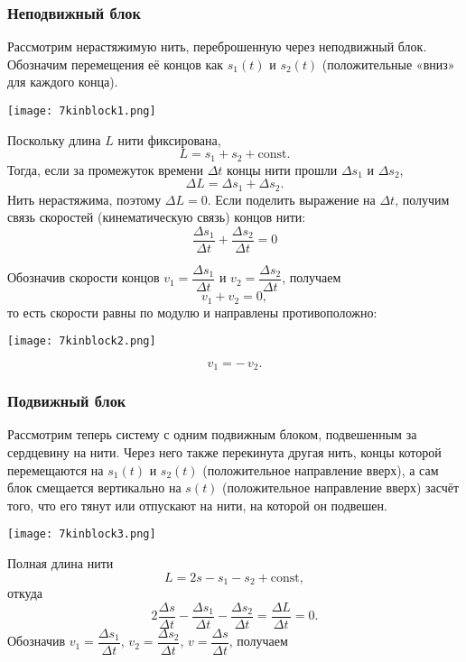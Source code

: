 \documentclass[12pt, a4paper]{article}%
\begin{document}
\subsubsection*{Неподвижный блок}

Рассмотрим нерастяжимую нить, переброшенную через неподвижный блок. Обозначим перемещения её концов как
$s_1(t)$ и $s_2(t)$ (положительные «вниз» для каждого конца). 

\begin{center}
\texttt{[image: 7kinblock1.png]}
\label{fig:mpr}
\end{center}

Поскольку длина $L$ нити фиксирована,  
\[
L = s_1 + s_2 + \mathrm{const}.  
\]  
Тогда, если за промежуток времени $\Delta t$ концы нити прошли $\Delta s_1$ и $\Delta s_2$, 
\[
\Delta L = \Delta s_1 + \Delta s_2.
\]  
Нить нерастяжима, поэтому $\Delta L = 0$. Если поделить выражение на $\Delta t$, получим связь скоростей (кинематическую связь) концов нити:
\[
\frac{\Delta s_1}{\Delta t} + \frac{\Delta s_2}{\Delta t} = 0
\]

Обозначив скорости концов $v_1 = \dfrac{\Delta s_1}{\Delta t}$ и $v_2 = \dfrac{\Delta s_2}{\Delta t}$, получаем  
\[
v_1 + v_2 = 0,
\]  
то есть скорости равны по модулю и направлены противоположно:  
\begin{center}
\texttt{[image: 7kinblock2.png]}
\label{fig:mpr}
\end{center}

\[
v_1 = -\,v_2.
\]  

\subsubsection*{Подвижный блок}

Рассмотрим теперь систему с одним подвижным блоком, подвешенным за сердцевину на нити. Через него также перекинута другая нить, концы которой перемещаются на $s_1(t)$ и $s_2(t)$ (положительное направление вверх), а сам блок смещается вертикально 
на $s(t)$ (положительное направление вверх) засчёт того, что его тянут или отпускают на нити, на которой он подвешен. 

\begin{center}
\texttt{[image: 7kinblock3.png]}
\label{fig:mpr}
\end{center}

Полная длина нити  
\[
L = 2s - s_1 - s_2 + \mathrm{const},
\]  
откуда  
\[
2\frac{\Delta s}{\Delta t} - \frac{\Delta s_1}{\Delta t} - \frac{\Delta s_2}{\Delta t} = \frac{\Delta L}{\Delta t} = 0.
\]  
Обозначив $v_1=\dfrac{\Delta s_1}{\Delta t}$, $v_2=\dfrac{\Delta s_2}{\Delta t}$, $v=\dfrac{\Delta s}{\Delta t}$, получаем 
\end{document}
